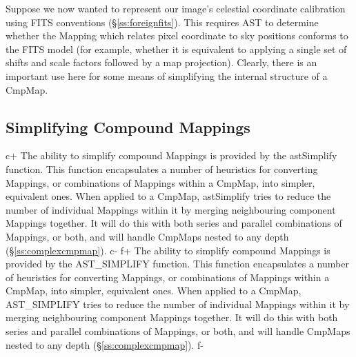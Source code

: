 \documentclass[twoside,11pt]{article}
\newcommand{\secref}[1]{\S\ref{#1}}
\newcommand{\secref}[1]{\ref{#1}}
\begin{document}
Suppose we now wanted to represent our image's celestial coordinate
calibration using FITS conventions (\secref{ss:foreignfits}). This
requires AST to determine whether the Mapping which relates pixel
coordinate to sky positions conforms to the FITS model (for example,
whether it is equivalent to applying a single set of shifts and scale
factors followed by a map projection). Clearly, there is an important
use here for some means of simplifying the internal structure of a
CmpMap.

\subsection{\label{ss:simplifyingcmpmaps}Simplifying Compound Mappings}

c+
The ability to simplify compound Mappings is provided by the
astSimplify function. This function encapsulates a number of
heuristics for converting Mappings, or combinations of Mappings within
a CmpMap, into simpler, equivalent ones. When applied to a CmpMap,
astSimplify tries to reduce the number of individual Mappings within
it by merging neighbouring component Mappings together. It will do
this with both series and parallel combinations of Mappings, or both,
and will handle CmpMaps nested to any depth
(\secref{ss:complexcmpmap}).
c-
f+
The ability to simplify compound Mappings is provided by the
AST\_SIMPLIFY function. This function encapsulates a number of
heuristics for converting Mappings, or combinations of Mappings within
a CmpMap, into simpler, equivalent ones. When applied to a CmpMap,
AST\_SIMPLIFY tries to reduce the number of individual Mappings within
it by merging neighbouring component Mappings together. It will do
this with both series and parallel combinations of Mappings, or both,
and will handle CmpMaps nested to any depth
(\secref{ss:complexcmpmap}).
f-
\end{document}
